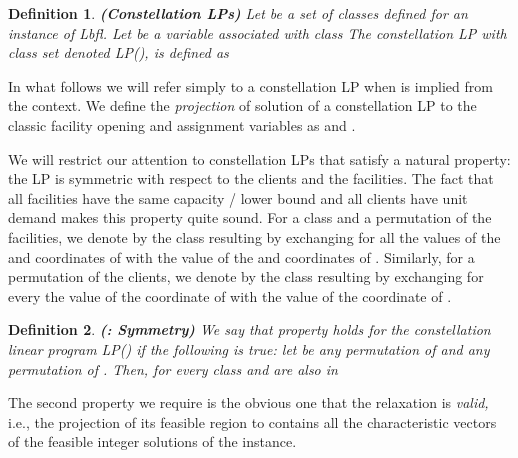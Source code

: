 \documentclass[11pt]{article}\usepackage{amsmath}
\newtheorem{definition}{Definition}[section]
\newcommand{\lbfl}{{\sc Lbfl}}
\begin{document}
\iffalse ------------

\begin{definition}  {\bf (Constellation LPs)} \label{def:constell}
Let  be a set of classes defined for an instance 
of
\lbfl. Let   be a variable associated with class 
The {\em  constellation LP with class set}
   is defined as 

 

\end{definition}
In what follows we will refer simply to a constellation LP when
 is implied from the context.  
------------------ \fi 

\begin{definition}  {\bf (Constellation LPs)} \label{def:constell}
Let  be a set of classes defined for an instance 
of
\lbfl. Let   be a variable associated with class 
The {\em  constellation LP with class set}
   denoted LP(),  is defined as 


 

\iffalse

\fi

\end{definition}
In what follows we will refer simply to a constellation LP when
 is implied from the context.  
We define the \emph{projection}  of solution  
of a  constellation LP to the classic facility opening
and assignment variables  as  and 
.


We will restrict our attention to  constellation LPs that satisfy a  natural property:   the LP is symmetric
 with respect to the clients and  the  facilities. 
The fact  that all facilities have the  same capacity / lower bound and all
clients have unit demand makes  this  property quite sound. 
For a class    and
 a permutation of the facilities, we denote by 
the class resulting by exchanging  for all  the values  of the   and
 coordinates 
of   with   the value of  the   and  coordinates of
. Similarly,  for  a permutation of the clients, we denote  by  the class resulting  by exchanging for
every   the value of  the  coordinate of   with
 the value of the  coordinate of .


\begin{definition} {\bf (: Symmetry)} \label{def:symmetry}
We  say  that property    holds for the constellation linear program LP()   if  the
following is  true: let  be any  permutation of   and  any permutation of .
 Then, for every  class    
and  are also in 
\end{definition}

The second property we require is the obvious one that the 
relaxation  is {\em valid,} i.e., the projection of its  feasible region to 
 contains all the characteristic vectors of the feasible integer solutions of the instance.
\end{document}
